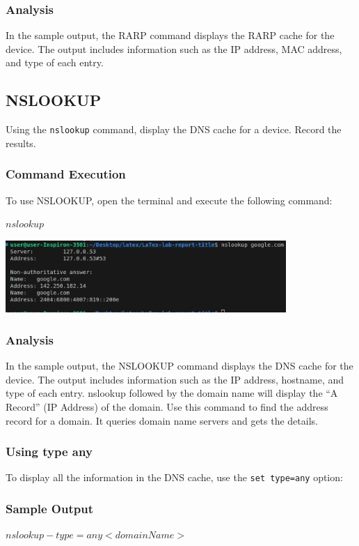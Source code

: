 \documentclass[12pt]{article}
\begin{document}
\subsubsection*{Analysis}
In the sample output, the RARP command displays the RARP cache for the device. The output includes information such as the IP address, MAC address, and type of each entry.

\subsection*{NSLOOKUP}
Using the {
    \texttt{nslookup}
} command, display the DNS cache for a device. Record the results.

\subsubsection*{Command Execution}
To use NSLOOKUP, open the terminal and execute the following command:

$nslookup$

\includegraphics[width=0.8\textwidth]{nslookup.png}\par\vspace{1cm}

\subsubsection*{Analysis}
In the sample output, the NSLOOKUP command displays the DNS cache for the device. The output includes information such as the IP address, hostname, and type of each entry. nslookup followed by the domain name will display the “A Record” (IP Address) of the domain. Use this command to find the address record for a domain. It queries domain name servers and gets the details. 

\subsubsection*{Using type any}
To display all the information in the DNS cache, use the \texttt{set type=any} option:

\subsubsection*{Sample Output}
$nslookup -type=any <domainName>$
\end{document}
